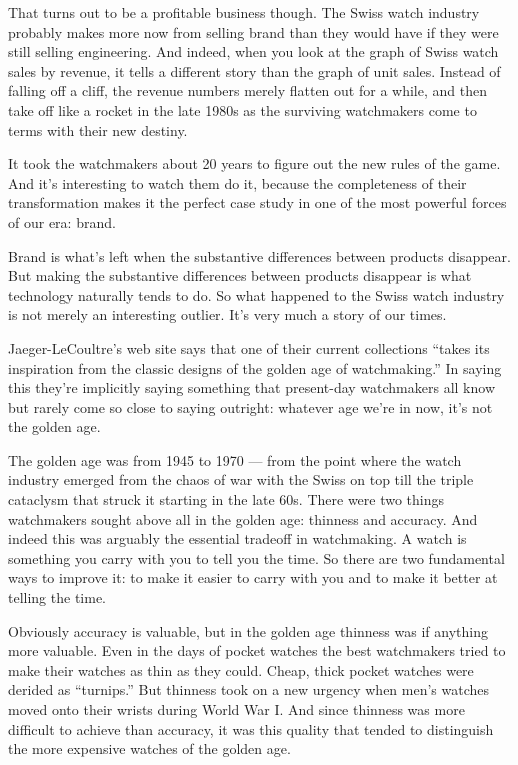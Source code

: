 \documentclass[12pt]{book}
\begin{document}
That turns out to be a profitable business though. The Swiss watch
industry probably makes more now from selling brand than they would have
if they were still selling engineering. And indeed, when you look at the
graph of Swiss watch sales by revenue, it tells a different story than
the graph of unit sales. Instead of falling off a cliff, the revenue
numbers merely flatten out for a while, and then take off like a rocket
in the late 1980s as the surviving watchmakers come to terms with their
new destiny.

It took the watchmakers about 20 years to figure out the new rules of
the game. And it's interesting to watch them do it, because the
completeness of their transformation makes it the perfect case study in
one of the most powerful forces of our era: brand.

Brand is what's left when the substantive differences between products
disappear. But making the substantive differences between products
disappear is what technology naturally tends to do. So what happened to
the Swiss watch industry is not merely an interesting outlier. It's very
much a story of our times.

Jaeger-LeCoultre's web site says that one of their current collections
``takes its inspiration from the classic designs of the golden age of
watchmaking.'' In saying this they're implicitly saying something that
present-day watchmakers all know but rarely come so close to saying
outright: whatever age we're in now, it's not the golden age.

The golden age was from 1945 to 1970 --- from the point where the watch
industry emerged from the chaos of war with the Swiss on top till the
triple cataclysm that struck it starting in the late 60s. There were two
things watchmakers sought above all in the golden age: thinness and
accuracy. And indeed this was arguably the essential tradeoff in
watchmaking. A watch is something you carry with you to tell you the
time. So there are two fundamental ways to improve it: to make it easier
to carry with you and to make it better at telling the time.

Obviously accuracy is valuable, but in the golden age thinness was if
anything more valuable. Even in the days of pocket watches the best
watchmakers tried to make their watches as thin as they could. Cheap,
thick pocket watches were derided as ``turnips.'' But thinness took on a
new urgency when men's watches moved onto their wrists during World War
I. And since thinness was more difficult to achieve than accuracy, it
was this quality that tended to distinguish the more expensive watches
of the golden age.
\end{document}
